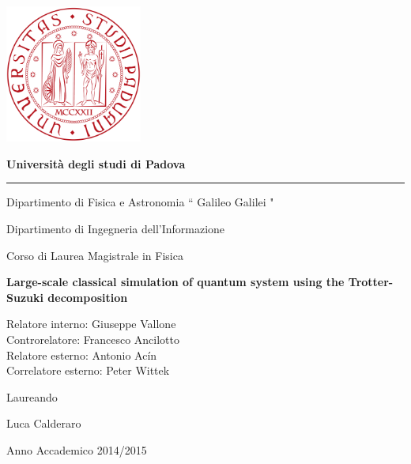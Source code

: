 \begin{titlepage}

\setlength{}
\setlength{}

\begin{center}
\vspace*{-2. cm}
\includegraphics[width=4.5cm]{Figs/Logo_Universita_Padova.png}
\vspace*{1 cm}

{\bfseries{\huge Universit\`a degli studi di Padova} }
\hrule

\vspace{1 cm}

{\Large Dipartimento di Fisica e Astronomia  `` Galileo Galilei "} 

\vspace{0.5cm}

{\Large Dipartimento di Ingegneria dell'Informazione} 
\vspace{1cm}

{\Large Corso di Laurea Magistrale in} 
{\Large Fisica}

\vspace{1.3 cm}

{\LARGE{\bfseries {Large-scale classical simulation of quantum system using the Trotter-Suzuki decomposition}}} 
\end{center}

\vfill
\raggedright
\large{Relatore interno: Giuseppe Vallone}  \\
\vspace{0.08cm}     
\large{Controrelatore: Francesco Ancilotto}  \\
\vspace{0.08cm} 
\large{Relatore esterno: Antonio Acín}  \\
\vspace{0.08cm}
\large{Correlatore esterno: Peter Wittek}  \\
\vspace{0.08 cm}

\raggedleft
\large{Laureando}

\large{Luca Calderaro} 

\vspace{1cm}
\begin{center}
{\large{ Anno Accademico 2014/2015}}
\end{center}


\end{titlepage}